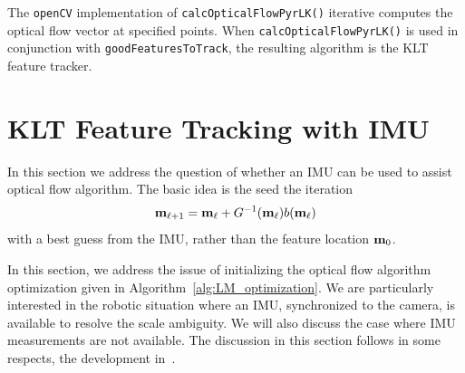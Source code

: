 The \texttt{openCV} implementation of \texttt{calcOpticalFlowPyrLK()} iterative computes the optical flow vector at specified points.  When \texttt{calcOpticalFlowPyrLK()} is used in conjunction with \texttt{goodFeaturesToTrack}, the resulting algorithm is the KLT feature tracker.


\section{KLT Feature Tracking with IMU}
\label{sec:klt_feature_tracking_with_imu}

In this section we address the question of whether an IMU can be used to assist optical flow algorithm.  The basic idea is the seed the iteration
\[
\mathbf{m}_{\ell+1} = \mathbf{m}_\ell + G^{-1}(\mathbf{m}_\ell)b(\mathbf{m}_\ell)
\]
with a best guess from the IMU, rather than the feature location $\mathbf{m}_0$.  



In this section, we address the issue of initializing the optical flow algorithm  optimization given in Algorithm~\ref{alg:LM_optimization}.  We are particularly interested in the robotic situation where an IMU, synchronized to the camera, is available to resolve the scale ambiguity.  We will also discuss the case where IMU measurements are not available.  The discussion in this section follows in some respects, the development in~\cite{ForsterCarloneDellaert17}.  

